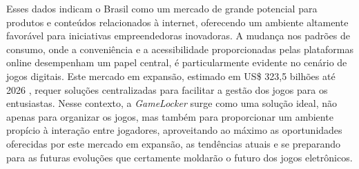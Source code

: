 Esses dados indicam o Brasil como um mercado de grande potencial para produtos e conteúdos relacionados à internet, oferecendo um ambiente altamente favorável para iniciativas empreendedoras inovadoras. A mudança nos padrões de consumo, onde a conveniência e a acessibilidade proporcionadas pelas plataformas online desempenham um papel central, é particularmente evidente no cenário de jogos digitais. Este mercado em expansão, estimado em US\$ 323,5 bilhões até 2026 \cite{pesquisa_global_games}, requer soluções centralizadas para facilitar a gestão dos jogos para os entusiastas. Nesse contexto, a \textit{GameLocker} surge como uma solução ideal, não apenas para organizar os jogos, mas também para proporcionar um ambiente propício à interação entre jogadores, aproveitando ao máximo as oportunidades oferecidas por este mercado em expansão, as tendências atuais e se preparando para as futuras evoluções que certamente moldarão o futuro dos jogos eletrônicos.